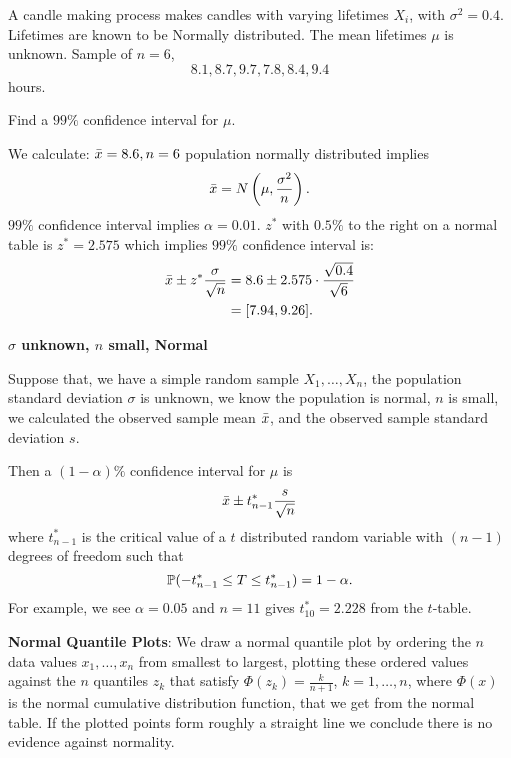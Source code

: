 \documentclass[10pt, a4paper]{article}
\begin{document}
\begin{example}
    A candle making process makes candles with varying lifetimes $X_i$,
    with $\sigma ^ 2 = 0.4$.
    Lifetimes are known to be Normally distributed.
    The mean lifetimes $\mu$ is unknown.
    Sample of $n = 6$,
    \[
    8.1, 8.7, 9.7, 7.8, 8.4, 9.4
    \]
    hours.

    Find a $99\%$ confidence interval for $\mu$.

    \begin{solution}
        We calculate:
        $\Bar{x} = 8.6, n = 6$ population normally distributed implies
        \[
        \Bar{x} = N\left(\mu, \frac{\sigma ^ 2}{n}\right).
        \]
        $99\%$ confidence interval implies $\alpha = 0.01$.
        $z ^ {*}$ with $0.5\%$ to the right on a normal table is $z ^ {*} = 2.575$ which implies $99\%$ confidence interval is:
        \begin{align*}
            \Bar{x} \pm z ^ {*}\frac{\sigma}{\sqrt{n}} &= 8.6 \pm 2.575 \cdot \frac{\sqrt{0.4}}{\sqrt{6}} \\
            &= [7.94, 9.26].
        \end{align*}
    \end{solution}
\end{example}

\textbf{$\sigma$ unknown,
$n$ small,
Normal}

Suppose that,
we have a simple random sample $X_1, \dotsc, X_n$,
the population standard deviation $\sigma$ is unknown,
we know the population is normal,
$n$ is small,
we calculated the observed sample mean $\Bar{x}$,
and the observed sample standard deviation $s$.

Then a $(1 - \alpha)\%$ confidence interval for $\mu$ is
\[
\Bar{x} \pm t_{n - 1}^{*}\frac{s}{\sqrt{n}}
\]
where $t_{n - 1}^{*}$ is the critical value of a $t$ distributed random variable with $(n - 1)$ degrees of freedom such that
\[
\P(-t_{n - 1}^{*} \leq T \leq t_{n - 1}^{*}) = 1 - \alpha.
\]
For example,
we see $\alpha = 0.05$ and $n = 11$ gives $t_{10}^{*} = 2.228$ from the $t$-table.

\textbf{Normal Quantile Plots}:
We draw a normal quantile plot by ordering the $n$ data values $x_1, \dotsc, x_n$ from smallest to largest,
plotting these ordered values against the $n$ quantiles $z_k$ that satisfy $\Phi(z_k) = \frac{k}{n + 1}$,
$k = 1, \dotsc, n$,
where $\Phi(x)$ is the normal cumulative distribution function,
that we get from the normal table.
If the plotted points form roughly a straight line we conclude there is no evidence against normality.
\end{document}
